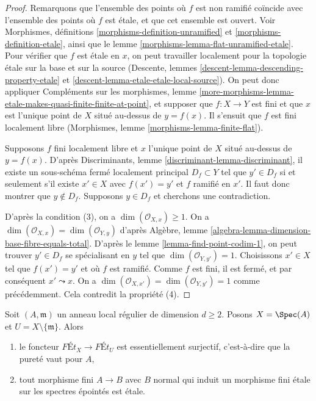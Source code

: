 \begin{proof}
Remarquons que l'ensemble des points où $f$ est non ramifié coïncide avec
l'ensemble des points où $f$ est étale, et que cet ensemble est ouvert.
Voir Morphismes, définitions \ref{morphisms-definition-unramified}
et \ref{morphisms-definition-etale}, ainsi que le
lemme \ref{morphisms-lemma-flat-unramified-etale}.
Pour vérifier que $f$ est étale en $x$, on peut travailler localement pour la topologie étale
sur la base et sur la
source (Descente, lemmes \ref{descent-lemma-descending-property-etale} et
\ref{descent-lemma-etale-etale-local-source}).
On peut donc appliquer Compléments sur les morphismes, lemme
\ref{more-morphisms-lemma-etale-makes-quasi-finite-finite-at-point},
et supposer que $f : X \to Y$ est fini et que $x$ est l'unique
point de $X$ situé au-dessus de $y = f(x)$.
Il s'ensuit que $f$ est fini localement libre
(Morphismes, lemme \ref{morphisms-lemma-finite-flat}).

\medskip\noindent
Supposons $f$ fini localement libre et $x$ l'unique point de
$X$ situé au-dessus de $y = f(x)$. D'après
Discriminants, lemme \ref{discriminant-lemma-discriminant},
il existe un sous-schéma fermé localement principal $D_f \subset Y$
tel que $y' \in D_f$ si et seulement s'il existe $x' \in X$
avec $f(x') = y'$ et $f$ ramifié en $x'$. Il faut donc montrer
que $y \not \in D_f$. Supposons $y \in D_f$ et cherchons une contradiction.

\medskip\noindent
D'après la condition (3), on a $\dim(\mathcal{O}_{X, x}) \geq 1$.
On a $\dim(\mathcal{O}_{X, x}) = \dim(\mathcal{O}_{Y, y})$ d'après
Algèbre, lemme \ref{algebra-lemma-dimension-base-fibre-equals-total}.
D'après le lemme \ref{lemma-find-point-codim-1},
on peut trouver $y' \in D_f$ se spécialisant en $y$
tel que $\dim(\mathcal{O}_{Y, y'}) = 1$.
Choisissons $x' \in X$ tel que $f(x') = y'$ et où $f$ est ramifié. Comme $f$
est fini, il est fermé, et par conséquent $x' \leadsto x$.
On a $\dim(\mathcal{O}_{X, x'}) = \dim(\mathcal{O}_{Y, y'}) = 1$
comme précédemment. Cela contredit la propriété (4).
\end{proof}

\begin{lemma}
\label{lemma-local-purity}
Soit $(A, \mathfrak m)$ un anneau local régulier de dimension $d \geq 2$.
Posons $X = \Spec(A)$ et $U = X \setminus \{\mathfrak m\}$. Alors
\begin{enumerate}
\item le foncteur $\textit{F\'Et}_X \to \textit{F\'Et}_U$
est essentiellement surjectif, c'est-à-dire que la pureté vaut pour $A$,
\item tout morphisme fini $A \to B$ avec $B$ normal qui
induit un morphisme fini étale sur les spectres épointés est étale.
\end{enumerate}
\end{lemma}

